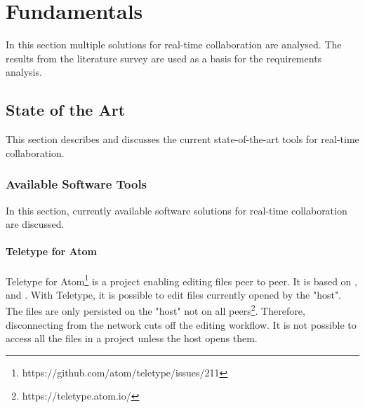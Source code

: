 \chapter{Fundamentals}
\label{sec:fundamentals}

In this section multiple solutions for real-time collaboration are analysed. 
The results from the literature survey are used as a basis for the requirements analysis.

\section{State of the Art}
\label{sec:stateoftheart}

This section describes and discusses the current state-of-the-art tools for real-time collaboration.

\subsection{Available Software Tools}

In this section, currently available software solutions for real-time collaboration are discussed.

\subsubsection{Teletype for Atom}
Teletype for Atom\footnote{https://github.com/atom/teletype/issues/211} is a project enabling editing files peer to peer. It is based on \cite{Oster:2006:DataconsistencyforP2Pcollaborativeediting}, \cite{YuWeihai:2014} and \cite{BriotUrsoShapiro:2016:HighResponsivenessGroupEditing}.
With Teletype, it is possible to edit files currently opened by the "host". The files are only persisted on the "host" not on all peers\footnote{https://teletype.atom.io/}.
Therefore, disconnecting from the network cuts off the editing workflow. It is not possible to access all the files in a project unless the host opens them. 
